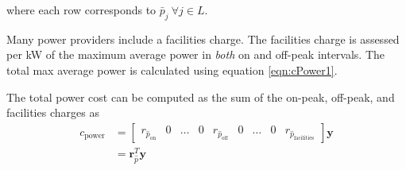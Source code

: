 where each row corresponds to $\bar{p}_j \ \forall j \in L$.
\par Many power providers include a facilities charge.  The facilities charge is assessed per kW of the maximum average power in \textit{both} on and off-peak intervals. The total max average power is calculated using equation \ref{eqn:cPower1}.
\par The total power cost can be computed as the sum of the on-peak, off-peak, and facilities charges as 
\begin{equation}
	\begin{aligned}
		c_\text{power} &= \begin{bmatrix}r_{\hat{p}_{\text{on}}}&0 & \hdots & 0 & r_{\hat{p}_{\text{off}}} & 0& \hdots &0& r_{\hat{p}_{\text{facilities}}} \end{bmatrix}\mathbf{y} \\
			&= \mathbf{r}_{\hat{p}}^T\mathbf{y}
	\end{aligned}
\end{equation}

